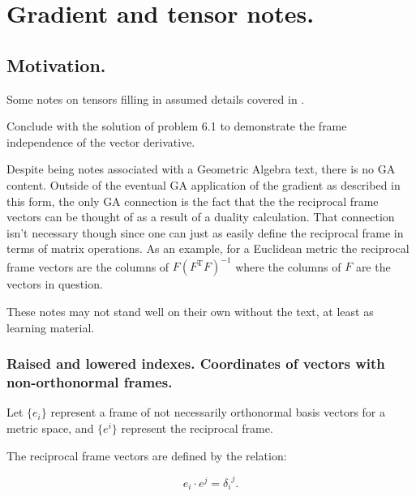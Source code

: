 \chapter{Gradient and tensor notes.}

\section{Motivation.}

Some notes on tensors filling in assumed details covered in 
\cite{doran2003gap}.


Conclude with the
solution of problem 6.1 to demonstrate the frame independence of the
vector derivative.

Despite being notes associated with a Geometric Algebra text, there is no
GA content.  Outside of the eventual GA application of the gradient as
described in this form, the only GA connection is the fact that the
the reciprocal frame vectors can be thought of as a result of a duality
calculation.  That connection isn't necessary though since one can just as
easily define the reciprocal frame in terms of matrix operations.  As an example, for a Euclidean metric the reciprocal frame vectors are the columns of
$F(F^\text{T}F)^{-1}$ where the columns of $F$ are the vectors in question.

These notes may not stand well on their own without the text, at least
as learning material.

\subsection{Raised and lowered indexes. Coordinates of vectors with non-orthonormal frames. }

Let $\{ e_i \}$ represent a frame of not necessarily orthonormal basis vectors for a metric space, and $\{ e^i \}$ represent the reciprocal frame.

The reciprocal frame vectors are defined by the relation:

\begin{equation}
e_i \cdot e^j = {\delta_i}^j.
\end{equation}

